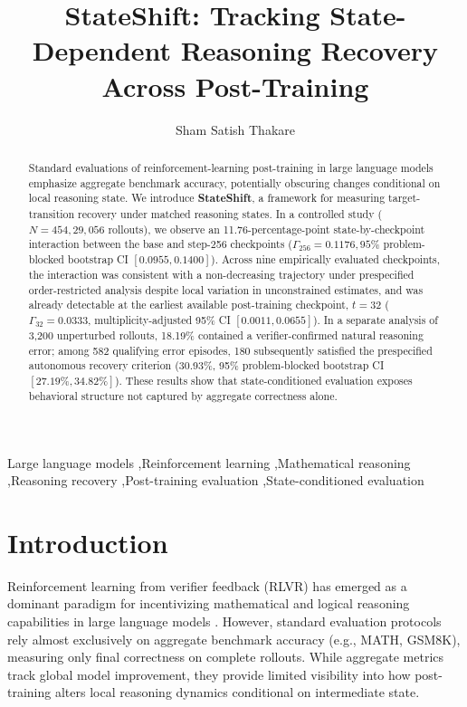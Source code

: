 \documentclass[11pt,3p,review]{elsarticle}
\begin{document}
\begin{frontmatter}

\title{StateShift: Tracking State-Dependent Reasoning Recovery Across Post-Training}

\author[inst1]{Sham Satish Thakare}
\address[inst1]{Independent Researcher, Pune, Maharashtra, India}

\begin{abstract}
Standard evaluations of reinforcement-learning post-training in large language models emphasize aggregate benchmark accuracy, potentially obscuring changes conditional on local reasoning state. We introduce \textbf{StateShift}, a framework for measuring target-transition recovery under matched reasoning states. In a controlled study ($N=454, 29,056$ rollouts), we observe an 11.76-percentage-point state-by-checkpoint interaction between the base and step-256 checkpoints ($\Gamma_{256}=0.1176, 95\%$ problem-blocked bootstrap CI $[0.0955, 0.1400]$). Across nine empirically evaluated checkpoints, the interaction was consistent with a non-decreasing trajectory under prespecified order-restricted analysis despite local variation in unconstrained estimates, and was already detectable at the earliest available post-training checkpoint, $t=32$ ($\Gamma_{32}=0.0333$, multiplicity-adjusted 95\% CI $[0.0011, 0.0655]$). In a separate analysis of 3,200 unperturbed rollouts, 18.19\% contained a verifier-confirmed natural reasoning error; among 582 qualifying error episodes, 180 subsequently satisfied the prespecified autonomous recovery criterion (30.93\%, 95\% problem-blocked bootstrap CI $[27.19\%, 34.82\%]$). These results show that state-conditioned evaluation exposes behavioral structure not captured by aggregate correctness alone.
\end{abstract}

\begin{keyword}
Large language models \sep Reinforcement learning \sep Mathematical reasoning \sep Reasoning recovery \sep Post-training evaluation \sep State-conditioned evaluation
\end{keyword}

\end{frontmatter}

\section{Introduction}
Reinforcement learning from verifier feedback (RLVR) has emerged as a dominant paradigm for incentivizing mathematical and logical reasoning capabilities in large language models \cite{Shao2024Deepseekmath, DeepSeek2025Deepseek}. However, standard evaluation protocols rely almost exclusively on aggregate benchmark accuracy (e.g., MATH, GSM8K), measuring only final correctness on complete rollouts. While aggregate metrics track global model improvement, they provide limited visibility into how post-training alters local reasoning dynamics conditional on intermediate state.
\end{document}
